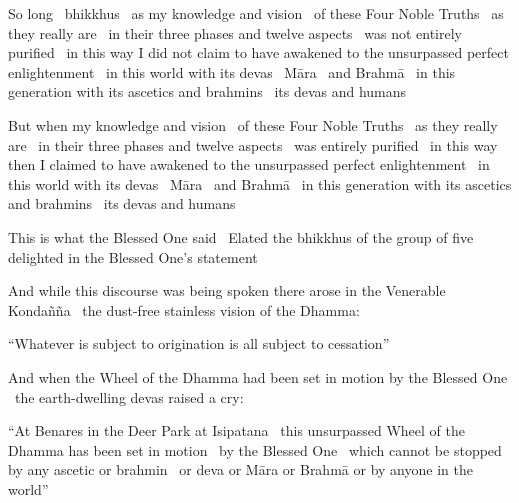 \begin{english-only-hang}
  So long \breathmark\ bhikkhus \breathmark\ as my knowledge and vision \breathmark\ of these Four Noble Truths \breathmark\ as they really are \breathmark\ in their three phases and twelve aspects \breathmark\ was not entirely purified \breathmark\ in this way I did not claim to have awakened to the unsurpassed perfect enlightenment \breathmark\ in this world with its devas \breathmark\ Māra \breathmark\ and Brahmā \breathmark\ in this generation with its ascetics and brahmins \breathmark\ its devas and humans
\end{english-only-hang}

\begin{english-only-hang}
  But when my knowledge and vision \breathmark\ of these Four Noble Truths \breathmark\ as they really are \breathmark\ in their three phases and twelve aspects \breathmark\ was entirely purified \breathmark\ in this way then I claimed to have awakened to the unsurpassed perfect enlightenment \breathmark\ in this world with its devas \breathmark\ Māra \breathmark\ and Brahmā \breathmark\ in this generation with its ascetics and brahmins \breathmark\ its devas and humans
\end{english-only-hang}

\begin{english-only-hang}
  This is what the Blessed One said \breathmark\ Elated the bhikkhus of the group of five delighted in the Blessed One's statement
\end{english-only-hang}

\begin{english-only-hang}
  And while this discourse was being spoken there arose in the Venerable Kondañña \breathmark\ the dust-free stainless vision of the Dhamma:
\end{english-only-hang}

\begin{english-only-hang}
  ``Whatever is subject to origination is all subject to cessation''
\end{english-only-hang}

\begin{english-only-hang}
  And when the Wheel of the Dhamma had been set in motion by the Blessed One \breathmark\ the earth-dwelling devas raised a cry:
\end{english-only-hang}

\begin{english-only-hang}
  ``At Benares in the Deer Park at Isipatana \breathmark\ this unsurpassed Wheel of the Dhamma has been set in motion \breathmark\ by the Blessed One \breathmark\ which cannot be stopped by any ascetic or brahmin \breathmark\ or deva or Māra or Brahmā or by anyone in the world''
\end{english-only-hang}

